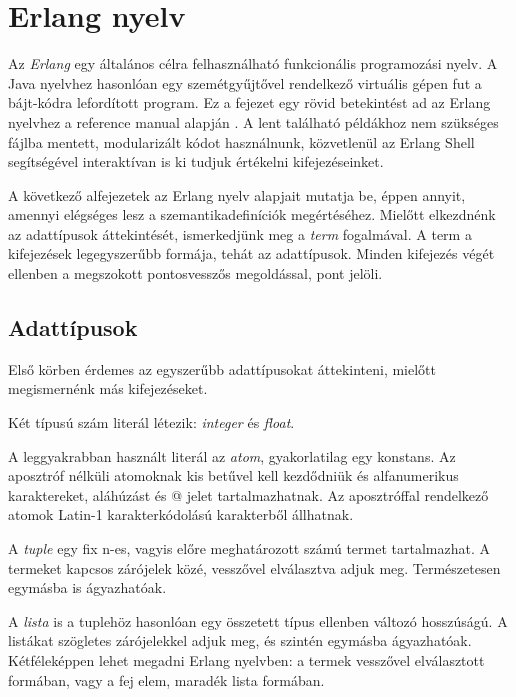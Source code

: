 \section{Erlang nyelv}
Az \textit{Erlang} egy általános célra felhasználható funkcionális programozási nyelv. A Java nyelvhez hasonlóan egy szemétgyűjtővel rendelkező virtuális gépen fut a bájt-kódra lefordított program. Ez a fejezet egy rövid betekintést ad az Erlang nyelvhez a reference manual alapján \cite{RefMan}. A lent található példákhoz nem szükséges fájlba mentett, modularizált kódot használnunk, közvetlenül az Erlang Shell segítségével interaktívan is ki tudjuk értékelni kifejezéseinket.

A következő alfejezetek az Erlang nyelv alapjait mutatja be, éppen annyit, amennyi elégséges lesz a szemantikadefiníciók megértéséhez. Mielőtt elkezdnénk az adattípusok áttekintését, ismerkedjünk meg a \textit{term} fogalmával. A term a kifejezések legegyszerűbb formája, tehát az adattípusok. Minden kifejezés végét ellenben a megszokott pontosvesszős megoldással, pont jelöli.

\subsection{Adattípusok}
Első körben érdemes az egyszerűbb adattípusokat áttekinteni, mielőtt megismernénk más kifejezéseket.

Két típusú szám literál létezik: \textit{integer} és \textit{float}.%

%

A leggyakrabban használt literál az \textit{atom}, gyakorlatilag egy konstans. Az aposztróf nélküli atomoknak kis betűvel kell kezdődniük és alfanumerikus karaktereket, aláhúzást és @ jelet tartalmazhatnak. Az aposztróffal rendelkező atomok Latin-1 karakterkódolású karakterből állhatnak.



A \textit{tuple} egy fix n-es, vagyis előre meghatározott számú termet tartalmazhat. A termeket kapcsos zárójelek közé, vesszővel elválasztva adjuk meg. Természetesen egymásba is ágyazhatóak.



A \textit{lista} is a tuplehöz hasonlóan egy összetett típus ellenben változó hosszúságú. A listákat szögletes zárójelekkel adjuk meg, és szintén egymásba ágyazhatóak. Kétféleképpen lehet megadni Erlang nyelvben: a termek vesszővel elválasztott formában, vagy a fej elem, maradék lista formában.

